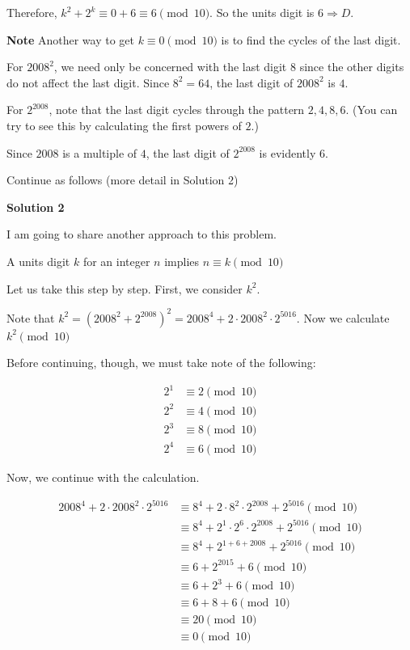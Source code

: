 \begin{enumerate}
 Therefore, $k^2+2^k \equiv 0+6 \equiv 6 \pmod{10}$. So the units digit is $6 \Rightarrow \boxed{D}$.

 \textbf{Note} Another way to get $k \equiv 0 \pmod{10}$ is to find the cycles of the last digit.

 For $2008^2$, we need only be concerned with the last digit $8$ since the other digits do not affect the last digit. Since $8^{2} = 64$, the last digit of $2008^2$ is $4$.

 For $2^{2008}$, note that the last digit cycles through the pattern ${2, 4, 8, 6}$. (You can try to see this by calculating the first powers of $2$.)

 Since $2008$ is a multiple of $4$, the last digit of $2^{2008}$ is evidently $6.$

 Continue as follows (more detail in Solution 2)

 



\textbf{Solution 2}

I am going to share another approach to this problem.

 A units digit $k$ for an integer $n$ implies $n \equiv k \pmod{10}$

 Let us take this step by step. First, we consider $k^2.$

 Note that $k^2 = \left(2008^2 + 2^{2008}\right)^2 = 2008^4 + 2 \cdot 2008^2 \cdot 2^{5016}.$ Now we calculate $k^2 \pmod{10}$

 Before continuing, though, we must take note of the following:

 
 \begin{align*} 2^1 &\equiv 2 \pmod {10} \\ 2^2 &\equiv 4 \pmod {10} \\ 2^3 &\equiv 8 \pmod {10} \\ 2^4 &\equiv 6 \pmod {10} \end{align*}


 Now, we continue with the calculation.

 
 \begin{align*} 2008^4 + 2 \cdot 2008^2 \cdot 2^{5016} &\equiv 8^4 + 2 \cdot 8^2 \cdot 2^{2008} + 2^{5016} \pmod{10} \\ &\equiv 8^4 + 2^1 \cdot 2^6 \cdot 2^{2008} + 2^{5016} \pmod{10} \\ &\equiv 8^4 + 2^{1+6+2008} + 2^{5016} \pmod{10} \\ &\equiv 6 + 2^{2015} + 6 \pmod{10} \\ &\equiv 6 + 2^{3} + 6 \pmod{10} \\ &\equiv 6 + 8 + 6 \pmod{10} \\ &\equiv 20 \pmod{10} \\ &\equiv 0 \pmod{10} \\ \end{align*}



\end{enumerate}
